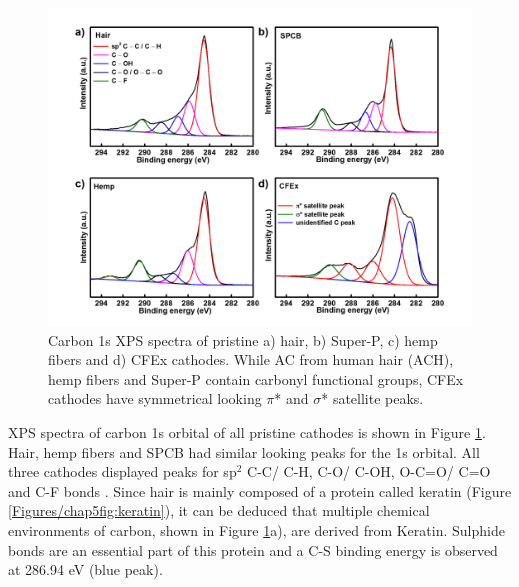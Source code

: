 \begin{figure}[tbh!]
  \centering
  \includegraphics[width=\textwidth]{Figures/chap5fig/XPSC}
    \caption{Carbon 1s XPS spectra of pristine a) hair, b) Super-P, c) hemp fibers and d) CFEx cathodes. While AC from human hair (ACH), hemp fibers and Super-P contain carbonyl functional groups, CFEx cathodes have symmetrical looking $\pi$* and $\sigma$* satellite peaks.}
  \label{Figures/chap5fig:XPSC}
\end{figure}

XPS spectra of carbon 1s orbital of all pristine cathodes is shown in Figure \ref{Figures/chap5fig:XPSC}. Hair, hemp fibers and SPCB had similar looking peaks for the 1s orbital. All three cathodes displayed peaks for sp$^2$ C-C/ C-H, C-O/ C-OH, O-C=O/ C=O and C-F bonds . Since hair is mainly composed of a protein called keratin (Figure \ref{Figures/chap5fig:keratin}), it can be deduced that multiple chemical environments of carbon, shown in Figure \ref{Figures/chap5fig:XPSC}a), are derived from Keratin. Sulphide bonds are an essential part of this protein and a C-S binding energy is observed at 286.94 eV (blue peak).


